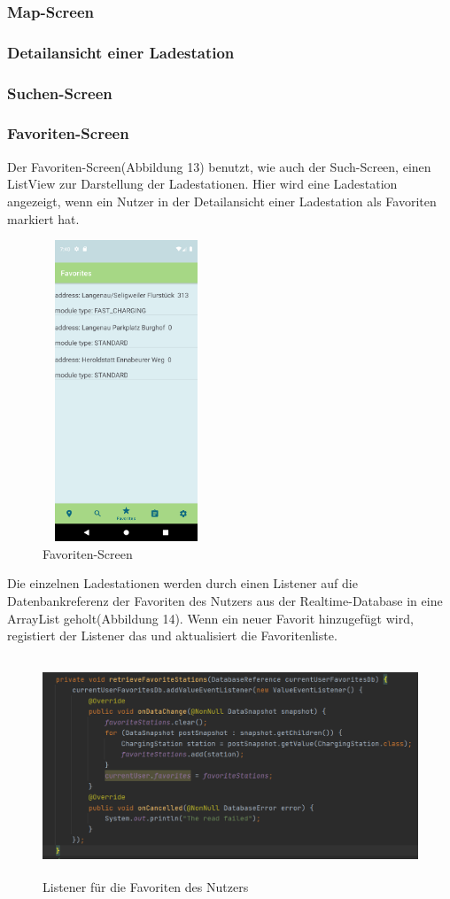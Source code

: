 \documentclass[12pt, a4paper, oneside]{article}
\begin{document}
\subsubsection{Map-Screen}
\subsubsection{Detailansicht einer Ladestation}
\subsubsection{Suchen-Screen}
\subsubsection{Favoriten-Screen}
Der Favoriten-Screen(Abbildung 13) benutzt, wie auch der Such-Screen, einen ListView zur Darstellung der Ladestationen. Hier wird eine Ladestation angezeigt, wenn ein Nutzer in der Detailansicht einer Ladestation als Favoriten markiert hat.
\begin{figure}
\includegraphics[width=5cm, height=9cm]{Favoriten-Screen.png}
\centering
\caption{Favoriten-Screen}\label{favorite_screen}
\end{figure}
Die einzelnen Ladestationen werden durch einen Listener auf die Datenbankreferenz der Favoriten des Nutzers aus der Realtime-Database in eine ArrayList geholt(Abbildung 14). Wenn ein neuer Favorit hinzugefügt wird, registiert der Listener das und aktualisiert die Favoritenliste.
\begin{figure}
\includegraphics[width=1\textwidth, height=6.5cm]{FavoriteListener.png}
\centering
\caption{Listener für die Favoriten des Nutzers}\label{favorite_listener}
\end{figure}
\end{document}
